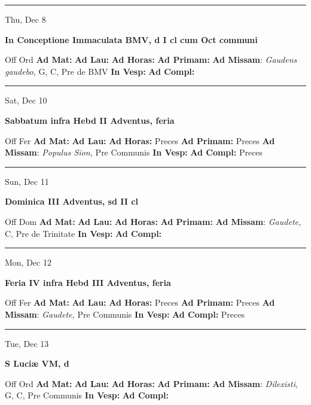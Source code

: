 \documentclass[letterpaper, 10pt]{article}
\begin{document}
\hrule
\begin{center}
Thu, Dec 8
\end{center}\textbf{ \large In Conceptione Immaculata BMV, \textnormal{\normalsize d I cl cum Oct communi}}
\begin{justify}
Off Ord
\textbf{Ad Mat: }
\textbf{Ad Lau: }
\textbf{Ad Horas: }
\textbf{Ad Primam: }
\textbf{Ad Missam}: \textit{Gaudens gaudebo,} G, C, Pre de BMV
\textbf{In Vesp: }
\textbf{Ad Compl: }\end{justify}



\hrule
\begin{center}
Sat, Dec 10
\end{center}\textbf{ \large Sabbatum infra Hebd II Adventus, \textnormal{\normalsize feria}}
\begin{justify}
Off Fer
\textbf{Ad Mat: }
\textbf{Ad Lau: }
\textbf{Ad Horas: }Preces
\textbf{Ad Primam: }Preces
\textbf{Ad Missam}: \textit{Populus Sion,} Pre Communis
\textbf{In Vesp: }
\textbf{Ad Compl: }Preces\end{justify}



\hrule
\begin{center}
Sun, Dec 11
\end{center}\textbf{ \large Dominica III Adventus, \textnormal{\normalsize sd II cl}}
\begin{justify}
Off Dom
\textbf{Ad Mat: }
\textbf{Ad Lau: }
\textbf{Ad Horas: }
\textbf{Ad Primam: }
\textbf{Ad Missam}: \textit{Gaudete,} C, Pre de Trinitate
\textbf{In Vesp: }
\textbf{Ad Compl: }\end{justify}



\hrule
\begin{center}
Mon, Dec 12
\end{center}\textbf{ \large Feria IV infra Hebd III Adventus, \textnormal{\normalsize feria}}
\begin{justify}
Off Fer
\textbf{Ad Mat: }
\textbf{Ad Lau: }
\textbf{Ad Horas: }Preces
\textbf{Ad Primam: }Preces
\textbf{Ad Missam}: \textit{Gaudete,} Pre Communis
\textbf{In Vesp: }
\textbf{Ad Compl: }Preces\end{justify}



\hrule
\begin{center}
Tue, Dec 13
\end{center}\textbf{ \large S Luciæ VM, \textnormal{\normalsize d}}
\begin{justify}
Off Ord
\textbf{Ad Mat: }
\textbf{Ad Lau: }
\textbf{Ad Horas: }
\textbf{Ad Primam: }
\textbf{Ad Missam}: \textit{Dilexisti,} G, C, Pre Communis
\textbf{In Vesp: }
\textbf{Ad Compl: }\end{justify}
\end{document}
